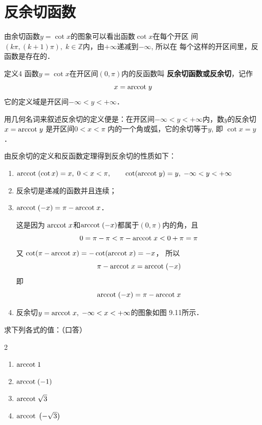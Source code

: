 \section{反余切函数}
由余切函数$y=\cot x$的图象可以看出函数$\cot x$在每个开区
间$(k\pi ,(k+1)\pi ),\; k\in\mathbb{Z}$内，由$+\infty$递减到$-\infty$, 所以在
每个这样的开区间里，反函数是存在的．

\begin{blk}{定义4}
     函数$y=\cot x$在开区间$(0,\pi )$内的反函数叫
\textbf{反余切函数或反余切}，记作
\[x={\rm arccot\; } y\]
它的定义域是开区间$-\infty<y<+\infty$．
\end{blk}


用几何名词来叙述反余切的定义便是：在开区间$-\infty<y<+\infty$内，数$y$的反余切
$x={\rm arccot\; } y$
是开区间$0<x<\pi$ 内的一个角或弧，它的余切等于$y$, 即
$\cot x=y$．

由反余切的定义和反函数定理得到反余切的性质如下：
\begin{enumerate}
    \item ${\rm arccot\; } (\cot x)=x,\; 0<x<\pi ,\qquad 
\cot ({\rm arccot\; } y)=y,\; -\infty<y<+\infty$
\item 反余切是递减的函数并且连续；
\item ${\rm arccot\; } (-x)=\pi -{\rm arccot\; } x$．

这是因为
${\rm arccot\; } x$和${\rm arccot\; } (-x)$都属于$(0,\pi )$内的角，且
\[0=\pi -\pi <\pi - {\rm arccot\; } x<0+\pi =\pi \]
又
$\cot (\pi -{\rm arccot\; } x)=-\cot ({\rm arccot\; } x)=-x$，
所以
\[\pi -{\rm arccot\; } x={\rm arccot\; } (-x)\]
即
\[{\rm arccot\; } (-x)=\pi -{\rm arccot\; } x\]
\item 反余切$y={\rm arccot\; } x,\; -\infty<x<+\infty$的图象如图
9.11所示．
\end{enumerate}

\begin{figure}[htp]
    \centering
{}    
    \caption{}
\end{figure}



\begin{example}
    求下列各式的值：（口答）
\begin{multicols}{2}
\begin{enumerate}
    \item ${\rm arccot\; } 1$
    \item ${\rm arccot\; } (- 1)$
    \item ${\rm arccot\; } \sqrt{3}$
    \item ${\rm arccot\; } \left(-\sqrt{3}\right)$
\end{enumerate}
\end{multicols}
\end{example}

